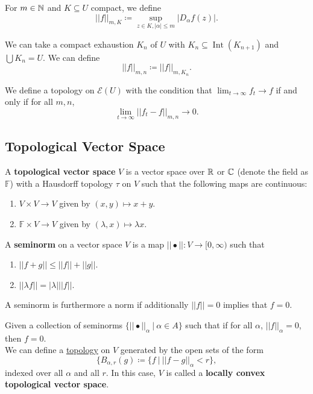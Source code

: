 \documentclass{article}
\begin{document}
{For $m \in \mathbb{N}$ and $K \subseteq U$ compact, we define
\[||f||_{m, K} \coloneqq \sup_{z \in K, |\alpha| \leq m} |D_\alpha f(z)|.\]

We can take a compact exhaustion $K_n$ of $U$ with $K_n \subseteq \operatorname{Int}(K_{n+1})$ and $\bigcup K_n = U$. We can define
\[||f||_{m, n} \coloneqq ||f||_{m, K_n}.\]

We define a topology on $\mathcal{E}(U)$ with the condition that $\lim_{t \to \infty} f_t \to f$ if and only if for all $m, n$, 
\[\lim_{t \to \infty} ||f_t - f||_{m, n} \to 0.\]

\subsection{Topological Vector Space}

\begin{definition}
    A \textbf{topological vector space} $V$ is a vector space over $\mathbb{R}$ or $\mathbb{C}$ (denote the field as $\mathbb{F}$) with a Hausdorff topology $\tau$ on $V$ such that the following maps are continuous:
    \begin{enumerate}
        \item $V \times V \to V$ given by $(x, y) \mapsto x + y$.
        \item $\mathbb{F} \times V \to V$ given by $(\lambda, x) \mapsto \lambda x$.
    \end{enumerate}
\end{definition}

\begin{definition}
    A \textbf{seminorm} on a vector space $V$ is a map $||\bullet||: V \to [0, \infty)$ such that
    \begin{enumerate}
        \item $||f + g|| \leq ||f|| + ||g||$.
        \item $||\lambda f|| = |\lambda| ||f||$.
    \end{enumerate}
    A seminorm is furthermore a norm if additionally $||f|| = 0$ implies that $f = 0$.
\end{definition}

\begin{definition}
Given a collection of seminorms $\{||\bullet||_\alpha\ |\ \alpha \in A\}$ such that if for all $\alpha$, $||f||_\alpha = 0$, then $f = 0$.\\

We can define a \underline{topology} on $V$ generated by the open sets of the form
\[\{B_{\alpha, r}(g) \coloneqq \{f\ |\ ||f - g||_\alpha < r\}, \]
indexed over all $\alpha$ and all $r$.
In this case, $V$ is called a \textbf{locally convex topological vector space}.
\end{definition}

}
\end{document}
